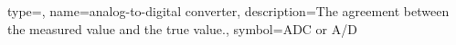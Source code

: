 

{
type=\thisgls,
name=analog-to-digital converter,
description={The agreement between the measured value and the true value.},
symbol={ADC or A/D}
}
